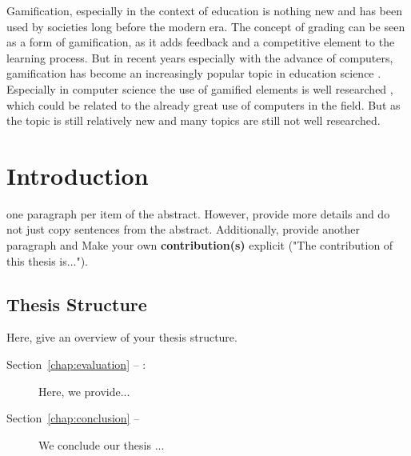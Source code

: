 Gamification, especially in the context of education is nothing new and has been used by societies long before the modern era.
The concept of grading can be seen as a form of gamification, as it adds feedback and a competitive element to the learning process.
But in recent years especially with the advance of computers, gamification has become an increasingly popular topic in education science \parencite{swachaStateResearchGamification2021}.
Especially in computer science the use of gamified elements is well researched \parencite{dichevGamifyingEducationWhat2017}, which could be related to the already great use of computers in the field.
But as the topic is still relatively new and many topics are still not well researched.

\section{Introduction}
one paragraph per item of the abstract. However, provide more details and do not just copy sentences from the abstract. 
Additionally, provide  another paragraph and  Make your own \textbf{contribution(s)} explicit ("The contribution of this thesis is...").


\subsection*{Thesis Structure}
Here, give an overview of your thesis structure.
\begin{description}
\item[Section~\ref{chap:evaluation} -- :] Here, we provide...
\item[Section~\ref{chap:conclusion} -- ] We conclude our thesis ...
\end{description}
